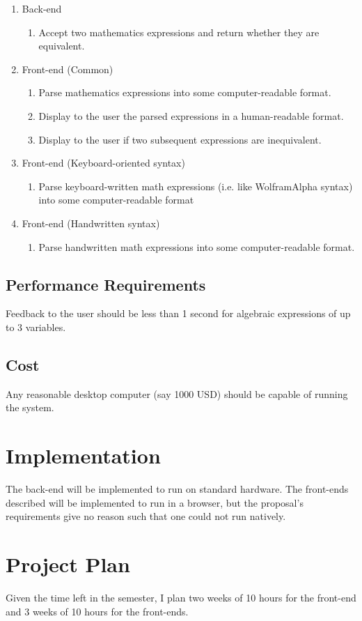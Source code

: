 \documentclass{abrice}
\begin{document}
\begin{enumerate}
\item Back-end
  \begin{enumerate}
  \item Accept two mathematics expressions and return whether they are
    equivalent.
  \end{enumerate}
\item Front-end (Common)
  \begin{enumerate}
  \item Parse mathematics expressions into some computer-readable format.
  \item Display to the user the parsed expressions in a human-readable format.
  \item Display to the user if two subsequent expressions are inequivalent.
  \end{enumerate}
\item Front-end (Keyboard-oriented syntax)
  \begin{enumerate}
  \item Parse keyboard-written math expressions (i.e. like WolframAlpha syntax)
    into some computer-readable format
  \end{enumerate}
\item Front-end (Handwritten syntax)
  \begin{enumerate}
  \item Parse handwritten math expressions into some computer-readable format.
  \end{enumerate}
\end{enumerate}

\subsection{Performance Requirements}

Feedback to the user should be  less than 1 second for algebraic expressions of
up to 3 variables.

\subsection{Cost}

Any reasonable desktop computer (say 1000 USD) should be capable of running the
system.

\section{Implementation}

The back-end will be implemented to run on standard hardware. The front-ends
described will be implemented to run in a browser, but the proposal's
requirements give no reason such that one could not run natively.

\section{Project Plan}

Given the time left in the semester, I plan two weeks of 10 hours for the
front-end and 3 weeks of 10 hours for the front-ends.
\end{document}
